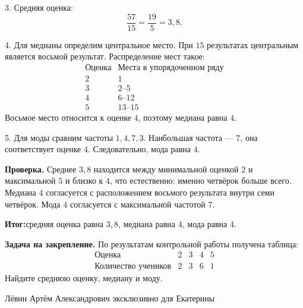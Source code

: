 \documentclass[12pt,a4paper]{article}
\newcommand{\outcome}{\textcolor{teal!60!black}{\textbf{Итог:}}}
\begin{document}
3. Средняя оценка:
\[
\frac{57}{15}=\frac{19}{5}=3{,}8.
\]

4. Для медианы определим центральное место. При $15$ результатах центральным является восьмой результат. Распределение мест такое:
\[
\begin{array}{c|c}
\text{Оценка} & \text{Места в упорядоченном ряду} \\
\hline
2 & 1 \\
3 & 2\text{--}5 \\
4 & 6\text{--}12 \\
5 & 13\text{--}15
\end{array}
\]
Восьмое место относится к оценке $4$, поэтому медиана равна $4$.

5. Для моды сравним частоты $1,4,7,3$. Наибольшая частота --- $7$, она соответствует оценке $4$. Следовательно, мода равна $4$.

\textbf{Проверка.}
Среднее $3{,}8$ находится между минимальной оценкой $2$ и максимальной $5$ и близко к $4$, что естественно: именно четвёрок больше всего. Медиана $4$ согласуется с расположением восьмого результата внутри семи четвёрок. Мода $4$ согласуется с максимальной частотой $7$.

\outcome средняя оценка равна $3{,}8$, медиана равна $4$, мода равна $4$.

\textbf{Задача на закрепление.}
По результатам контрольной работы получена таблица:
\[
\begin{array}{c|cccc}
\text{Оценка} & 2 & 3 & 4 & 5 \\
\hline
\text{Количество учеников} & 2 & 3 & 6 & 1
\end{array}
\]
Найдите среднюю оценку, медиану и моду.

\vfill
\begin{center}
\small Лёвин Артём Александрович эксклюзивно для Екатерины
\end{center}
\end{document}
